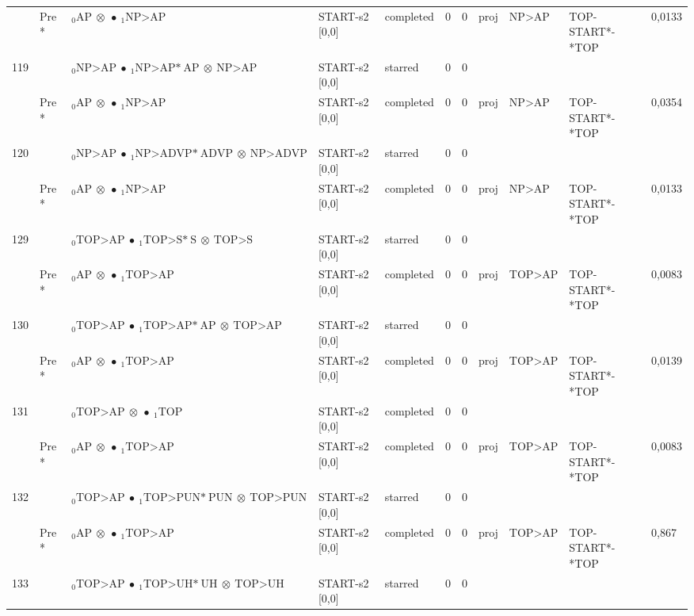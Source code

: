 \documentclass[10pt]{article}
\begin{document}
\begin{longtable}[htbp]{lllllllllll}
 & Pre *& $ {}_0 \textrm{AP} \  \otimes \  \bullet \ {}_{1} \textrm{NP>AP} $ & START-s2 [0,0] & completed & 0 & 0 & proj & NP>AP & TOP-START*-*TOP & 0,0133 \\ 
119 & & $ {}_0 \textrm{NP>AP} \  \bullet \ {}_{1} \textrm{NP>AP*} \ \textrm{AP} \  \otimes \ \textrm{NP>AP} $ & START-s2 [0,0] & starred & 0 & 0 & & & & \\ 
 & Pre *& $ {}_0 \textrm{AP} \  \otimes \  \bullet \ {}_{1} \textrm{NP>AP} $ & START-s2 [0,0] & completed & 0 & 0 & proj & NP>AP & TOP-START*-*TOP & 0,0354 \\ 
120 & & $ {}_0 \textrm{NP>AP} \  \bullet \ {}_{1} \textrm{NP>ADVP*} \ \textrm{ADVP} \  \otimes \ \textrm{NP>ADVP} $ & START-s2 [0,0] & starred & 0 & 0 & & & & \\ 
 & Pre *& $ {}_0 \textrm{AP} \  \otimes \  \bullet \ {}_{1} \textrm{NP>AP} $ & START-s2 [0,0] & completed & 0 & 0 & proj & NP>AP & TOP-START*-*TOP & 0,0133 \\ 
129 & & $ {}_0 \textrm{TOP>AP} \  \bullet \ {}_{1} \textrm{TOP>S*} \ \textrm{S} \  \otimes \ \textrm{TOP>S} $ & START-s2 [0,0] & starred & 0 & 0 & & & & \\ 
 & Pre *& $ {}_0 \textrm{AP} \  \otimes \  \bullet \ {}_{1} \textrm{TOP>AP} $ & START-s2 [0,0] & completed & 0 & 0 & proj & TOP>AP & TOP-START*-*TOP & 0,0083 \\ 
130 & & $ {}_0 \textrm{TOP>AP} \  \bullet \ {}_{1} \textrm{TOP>AP*} \ \textrm{AP} \  \otimes \ \textrm{TOP>AP} $ & START-s2 [0,0] & starred & 0 & 0 & & & & \\ 
 & Pre *& $ {}_0 \textrm{AP} \  \otimes \  \bullet \ {}_{1} \textrm{TOP>AP} $ & START-s2 [0,0] & completed & 0 & 0 & proj & TOP>AP & TOP-START*-*TOP & 0,0139 \\ 
131 & & $ {}_0 \textrm{TOP>AP} \  \otimes \  \bullet \ {}_{1} \textrm{TOP} $ & START-s2 [0,0] & completed & 0 & 0 & & & & \\ 
 & Pre *& $ {}_0 \textrm{AP} \  \otimes \  \bullet \ {}_{1} \textrm{TOP>AP} $ & START-s2 [0,0] & completed & 0 & 0 & proj & TOP>AP & TOP-START*-*TOP & 0,0083 \\ 
132 & & $ {}_0 \textrm{TOP>AP} \  \bullet \ {}_{1} \textrm{TOP>PUN*} \ \textrm{PUN} \  \otimes \ \textrm{TOP>PUN} $ & START-s2 [0,0] & starred & 0 & 0 & & & & \\ 
 & Pre *& $ {}_0 \textrm{AP} \  \otimes \  \bullet \ {}_{1} \textrm{TOP>AP} $ & START-s2 [0,0] & completed & 0 & 0 & proj & TOP>AP & TOP-START*-*TOP & 0,867 \\ 
133 & & $ {}_0 \textrm{TOP>AP} \  \bullet \ {}_{1} \textrm{TOP>UH*} \ \textrm{UH} \  \otimes \ \textrm{TOP>UH} $ & START-s2 [0,0] & starred & 0 & 0 & & & & \\ 

\end{longtable}
\end{document}
